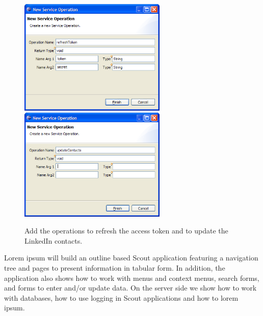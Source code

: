 \documentclass[a4paper,10pt,twoside]{book}
\begin{document}
\begin{figure}
\includegraphics[width=7cm]{new_operation_refreshtoken.png} \hspace{5mm}
\includegraphics[width=7cm]{new_operation_updatecontacts.png}
\caption{Add the operations to refresh the access token and to update the LinkedIn contacts.}
\end{figure}

Lorem ipsum will build an outline based Scout application featuring a navigation tree and pages to present information in tabular form. 
In addition, the application also shows how to work with menus and context menus, search forms, and forms to enter and/or update data. 
On the server side we show how to work with databases, how to use logging in Scout applications and how to lorem ipsum. 
\end{document}
